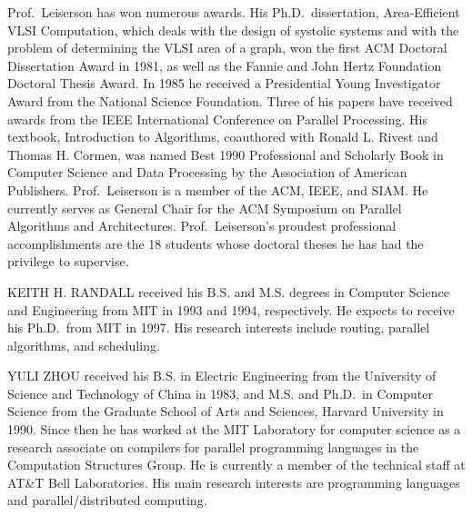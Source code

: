 \documentclass[
]{article}
\begin{document}
Prof.~Leiserson has won numerous awards. His Ph.D.~dissertation,
Area-Efficient VLSI Computation, which deals with the design of systolic
systems and with the problem of determining the VLSI area of a graph,
won the first ACM Doctoral Dissertation Award in 1981, as well as the
Fannie and John Hertz Foundation Doctoral Thesis Award. In 1985 he
received a Presidential Young Investigator Award from the National
Science Foundation. Three of his papers have received awards from the
IEEE International Conference on Parallel Processing. His textbook,
Introduction to Algorithms, coauthored with Ronald L. Rivest and Thomas
H. Cormen, was named Best 1990 Professional and Scholarly Book in
Computer Science and Data Processing by the Association of American
Publishers. Prof.~Leiserson is a member of the ACM, IEEE, and SIAM. He
currently serves as General Chair for the ACM Symposium on Parallel
Algorithms and Architectures. Prof.~Leiserson's proudest professional
accomplishments are the 18 students whose doctoral theses he has had the
privilege to supervise.

KEITH H. RANDALL received his B.S. and M.S. degrees in Computer Science
and Engineering from MIT in 1993 and 1994, respectively. He expects to
receive his Ph.D.~from MIT in 1997. His research interests include
routing, parallel algorithms, and scheduling.

YULI ZHOU received his B.S. in Electric Engineering from the University
of Science and Technology of China in 1983, and M.S. and Ph.D.~in
Computer Science from the Graduate School of Arts and Sciences, Harvard
University in 1990. Since then he has worked at the MIT Laboratory for
computer science as a research associate on compilers for parallel
programming languages in the Computation Structures Group. He is
currently a member of the technical staff at AT\&T Bell Laboratories.
His main research interests are programming languages and
parallel/distributed computing.
\end{document}
